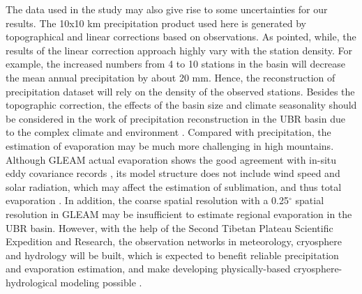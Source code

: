 \documentclass[hess, manuscript]{copernicus}
\begin{document}
The data used in the study may also give rise to some uncertainties for our results. 
The 10x10 km precipitation product used here is generated by topographical and linear corrections based on observations. As \citet{sun2020precipitation} pointed, while, the results of the linear correction approach highly vary with the station density. For example, the increased numbers from 4 to 10 stations in the basin will decrease the mean annual precipitation by about 20 mm. Hence, the reconstruction of precipitation dataset will rely on the density of the observed stations. 
Besides the topographic correction, the effects of the basin size and climate seasonality should be considered in the work of precipitation reconstruction in the UBR basin due to the complex climate and environment \citep{sun2019contrasting}. 
Compared with precipitation, the estimation of evaporation may be much more challenging in high mountains. Although GLEAM actual evaporation shows the good agreement with in-situ eddy covariance records \citep{yang2017multi}, its model structure does not include wind speed and solar radiation, which may affect the estimation of sublimation, and thus total evaporation \citep{li2019evapotranspiration}. 
In addition, the coarse spatial resolution with a 0.25$^{\circ}$ spatial resolution in GLEAM may be insufficient to estimate regional evaporation in the UBR basin. 
However, with the help of the Second Tibetan Plateau Scientific Expedition and Research, the observation networks in meteorology, cryosphere and hydrology will be built, which is expected to benefit reliable precipitation and evaporation estimation, and make developing physically-based cryosphere-hydrological modeling possible \citep{wang2022observing}.
\end{document}

